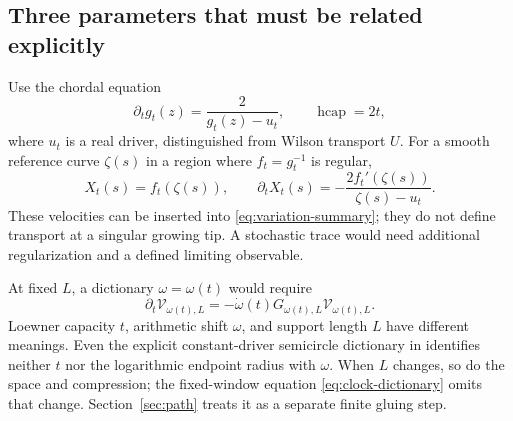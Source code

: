 \subsection{Three parameters that must be related explicitly}

Use the chordal equation
\begin{equation}\label{eq:main-loewner}
 \partial_tg_t(z)=\frac2{g_t(z)-u_t},
 \qquad \operatorname{hcap}=2t,
\end{equation}
where $u_t$ is a real driver, distinguished from Wilson transport
$U$. For a smooth reference curve $\zeta(s)$ in a region where
$f_t=g_t^{-1}$ is regular,
\[
 X_t(s)=f_t(\zeta(s)),\qquad
 \partial_tX_t(s)=-\frac{2f_t'(\zeta(s))}{\zeta(s)-u_t}.
\]
These velocities can be inserted into
\eqref{eq:variation-summary}; they do not define transport at a
singular growing tip. A stochastic trace would need additional
regularization and a defined limiting observable.

At fixed $L$, a dictionary $\omega=\omega(t)$ would require
\begin{equation}\label{eq:clock-dictionary}
 \partial_t\mathcal V_{\omega(t),L}
 =-\dot\omega(t)G_{\omega(t),L}\mathcal V_{\omega(t),L}.
\end{equation}
Loewner capacity $t$, arithmetic shift $\omega$, and support length
$L$ have different meanings. Even the explicit constant-driver
semicircle dictionary in \cite[Section~S3]{Supplement} identifies
neither $t$ nor the logarithmic endpoint radius with $\omega$.
When $L$ changes, so do the space and compression; the fixed-window
equation \eqref{eq:clock-dictionary} omits that change.
Section~\ref{sec:path} treats it as a separate finite gluing step.
